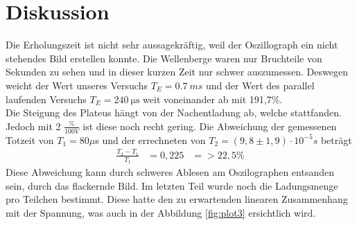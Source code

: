 \section{Diskussion}
\label{sec:Diskussion}
Die Erholungszeit ist nicht sehr aussagekräftig, weil der Oszillograph ein nicht stehendes Bild erstellen konnte.
Die Wellenberge waren nur Bruchteile von Sekunden zu sehen und in dieser kurzen Zeit nur schwer auszumessen.
Deswegen weicht der Wert unseres Versuchs $T_E=\SI{0.7}{ms}$ und der Wert des parallel laufenden Versuchs $T_E=\SI{240}{\micro\second}$ weit voneinander ab mit 191,7\%. \\
Die Steigung des Plateus hängt von der Nachentladung ab, welche stattfanden.
Jedoch mit 2 $\frac{\%}{100V}$ ist diese noch recht gering.
Die Abweichung der gemessenen Totzeit von $T_1 = 80 \mu$s und der errechneten von  $T_2 = (9,8 \pm 1,9)\cdot 10^{-5} s$ beträgt
\begin{align*}
    \frac{T_2-T_1}{T_1} &= 0,225
    &=> 22,5 \%
\end{align*}
Diese Abweichung kann durch schweres Ablesen am Oszilographen entsanden sein, durch das flackernde Bild.
Im letzten Teil wurde noch die Ladungsmenge pro Teilchen bestimmt.
Diese hatte den zu erwartenden linearen Zusammenhang mit der Spannung, was auch in der Abbildung \ref{fig:plot3} ersichtlich wird.